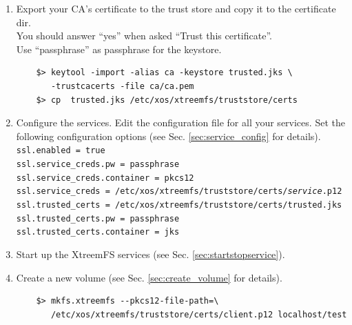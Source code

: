 \documentclass[a4paper,10pt]{book}
\begin{document}
\begin{enumerate}
\begin{enumerate}
	\item Export the service credentials (certificate and private key) as a PKCS\#12 file.\\
		Use ``passphrase'' as export password. You can leave the export password empty for the XtreemFS Client to avoid being asked for the password on mount.
		\begin{Verbatim}[commandchars=\\\{\}]
$> openssl pkcs12 -export -in \textit{service}.pem -inkey \textit{service}.key \ \\
   -out \textit{service}.p12 -name "\textit{service}"
		\end{Verbatim}

	\item Copy the PKCS\#12 file to the certificates directory.
		\begin{Verbatim}[commandchars=\\\{\}]
$> mkdir -p /etc/xos/xtreemfs/truststore/certs \\
$> cp \textit{service}.p12 /etc/xos/xtreemfs/truststore/certs
		\end{Verbatim}

	\end{enumerate}
 \item Export your CA's certificate to the trust store and copy it to the certificate dir.\\
	You should answer ``yes'' when asked ``Trust this certificate''.\\
	Use ``passphrase'' as passphrase for the keystore.
	\begin{verbatim}
	$> keytool -import -alias ca -keystore trusted.jks \
	   -trustcacerts -file ca/ca.pem
	$> cp  trusted.jks /etc/xos/xtreemfs/truststore/certs
	\end{verbatim}

 \item Configure the services.
	Edit the configuration file for all your services. Set the following configuration options (see Sec. \ref{sec:service_config} for details).\\
	\texttt{ssl.enabled = true}\\
	\texttt{ssl.service\_creds.pw = passphrase}\\
	\texttt{ssl.service\_creds.container = pkcs12}\\
	\texttt{ssl.service\_creds = /etc/xos/xtreemfs/truststore/certs/\textit{service}.p12}\\
	\texttt{ssl.trusted\_certs = /etc/xos/xtreemfs/truststore/certs/trusted.jks}\\
	\texttt{ssl.trusted\_certs.pw = passphrase}\\
	\texttt{ssl.trusted\_certs.container = jks}
 \item Start up the XtreemFS services (see Sec. \ref{sec:startstopservice}).
 \item Create a new volume (see Sec. \ref{sec:create_volume} for details).
	\begin{verbatim}
	$> mkfs.xtreemfs --pkcs12-file-path=\
	   /etc/xos/xtreemfs/truststore/certs/client.p12 localhost/test
	\end{verbatim}


\end{enumerate}
\end{document}

